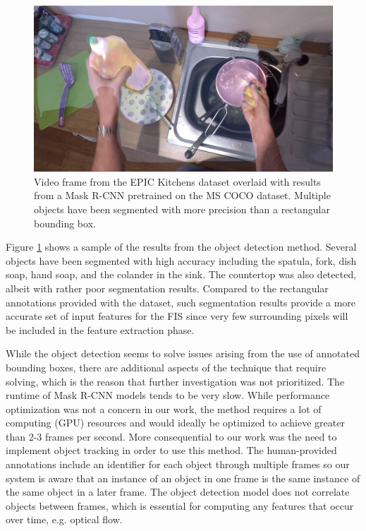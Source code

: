 \documentclass[12pt]{report}
\begin{document}
\begin{figure}[t]
\centerline{\includegraphics[width=.95\linewidth]{figure/2001_detectron.png}}
\caption{Video frame from the EPIC Kitchens dataset overlaid with results from a Mask R-CNN pretrained on the MS COCO dataset. Multiple objects have been segmented with more precision than a rectangular bounding box.}
\label{detectron_results}
\end{figure}

Figure \ref{detectron_results} shows a sample of the results from the object detection method. Several objects have been segmented with high accuracy including the spatula, fork, dish soap, hand soap, and the colander in the sink. The countertop was also detected, albeit with rather poor segmentation results. Compared to the rectangular annotations provided with the dataset, such segmentation results provide a more accurate set of input features for the FIS since very few surrounding pixels will be included in the feature extraction phase. 

While the object detection seems to solve issues arising from the use of annotated bounding boxes, there are additional aspects of the technique that require solving, which is the reason that further investigation was not prioritized. The runtime of Mask R-CNN models tends to be very slow. While performance optimization was not a concern in our work, the method requires a lot of computing (GPU) resources and would ideally be optimized to achieve greater than 2-3 frames per second. More consequential to our work was the need to implement object tracking in order to use this method. The human-provided annotations include an identifier for each object through multiple frames so our system is aware that an instance of an object in one frame is the same instance of the same object in a later frame. The object detection model does not correlate objects between frames, which is essential for computing any features that occur over time, e.g. optical flow.
\end{document}
